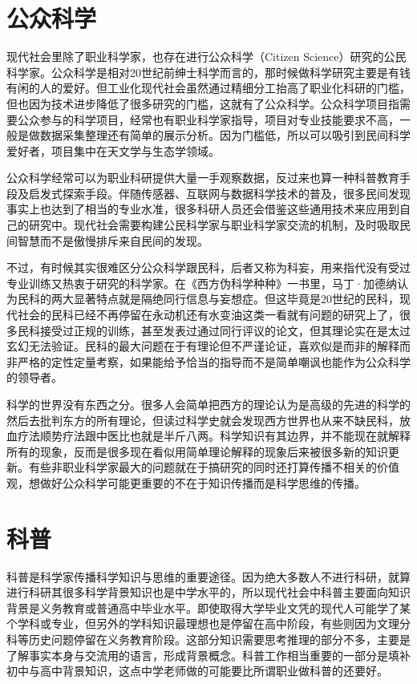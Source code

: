 \documentclass[]{tufte-book}
\begin{document}
\hypertarget{ux516cux4f17ux79d1ux5b66}{%
\section{公众科学}\label{ux516cux4f17ux79d1ux5b66}}

现代社会里除了职业科学家，也存在进行公众科学（Citizen Science）研究的公民科学家。公众科学是相对20世纪前绅士科学而言的，那时候做科学研究主要是有钱有闲的人的爱好。但工业化现代社会虽然通过精细分工抬高了职业化科研的门槛，但也因为技术进步降低了很多研究的门槛，这就有了公众科学。公众科学项目指需要公众参与的科学项目，经常也有职业科学家指导，项目对专业技能要求不高，一般是做数据采集整理还有简单的展示分析。因为门槛低，所以可以吸引到民间科学爱好者，项目集中在天文学与生态学领域。

公众科学经常可以为职业科研提供大量一手观察数据，反过来也算一种科普教育手段及启发式探索手段。伴随传感器、互联网与数据科学技术的普及，很多民间发现事实上也达到了相当的专业水准，很多科研人员还会借鉴这些通用技术来应用到自己的研究中。现代社会需要构建公民科学家与职业科学家交流的机制，及时吸取民间智慧而不是傲慢排斥来自民间的发现。

不过，有时候其实很难区分公众科学跟民科，后者又称为科妄，用来指代没有受过专业训练又热衷于研究的科学家。在《西方伪科学种种》一书里，马丁·加德纳认为民科的两大显著特点就是隔绝同行信息与妄想症。但这毕竟是20世纪的民科，现代社会的民科已经不再停留在永动机还有水变油这类一看就有问题的研究上了，很多民科接受过正规的训练，甚至发表过通过同行评议的论文，但其理论实在是太过玄幻无法验证。民科的最大问题在于有理论但不严谨论证，喜欢似是而非的解释而非严格的定性定量考察，如果能给予恰当的指导而不是简单嘲讽也能作为公众科学的领导者。

科学的世界没有东西之分。很多人会简单把西方的理论认为是高级的先进的科学的然后去批判东方的所有理论，但读过科学史就会发现西方世界也从来不缺民科，放血疗法顺势疗法跟中医比也就是半斤八两。科学知识有其边界，并不能现在就解释所有的现象，反而是很多现在看似用简单理论解释的现象后来被很多新的知识更新。有些非职业科学家最大的问题就在于搞研究的同时还打算传播不相关的价值观，想做好公众科学可能更重要的不在于知识传播而是科学思维的传播。

\hypertarget{ux79d1ux666e}{%
\section{科普}\label{ux79d1ux666e}}

科普是科学家传播科学知识与思维的重要途径。因为绝大多数人不进行科研，就算进行科研其很多科学背景知识也是中学水平的，所以现代社会中科普主要面向知识背景是义务教育或普通高中毕业水平。即使取得大学毕业文凭的现代人可能学了某个学科或专业，但另外的学科知识最理想也是停留在高中阶段，有些则因为文理分科等历史问题停留在义务教育阶段。这部分知识需要思考推理的部分不多，主要是了解事实本身与交流用的语言，形成背景概念。科普工作相当重要的一部分是填补初中与高中背景知识，这点中学老师做的可能要比所谓职业做科普的还要好。
\end{document}
